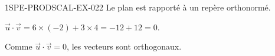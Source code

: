 \begin{corrige}{1SPE-PRODSCAL-EX-022}
Le plan est rapporté à un repère orthonormé.

$\vec{u} \cdot \vec{v} = 6 \times (-2) + 3 \times 4 = -12 + 12 = 0$.

Comme $\vec{u} \cdot \vec{v} = 0$, les vecteurs sont orthogonaux.
\end{corrige}
